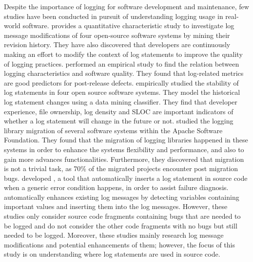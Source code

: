 Despite the importance of logging for software development and maintenance, few studies have been conducted in pursuit of understanding logging usage in real-world software. \citet{yuan2012characterizing} provides a quantitative characteristic study to investigate log message modifications of four open-source software systems by mining their revision history.  They have also discovered that developers are continuously making an effort to modify the context of log statements to improve the quality of logging practices. \citet{shang2015studying} performed an empirical study to find the relation between logging characteristics and software quality. They found that log-related metrics are good predictors for post-release defects. \citet{kabinna2016examining} empirically studied the stability of log statements in four open source software systems. They model the historical log statement changes using a data mining classifier. They find that developer experience, file ownership, log density and SLOC are important indicators of whether a log statement will change in the future or not.
\citet{kabinna2016logging} studied the logging library migration of several software systems within the Apache Software Foundation. They found that the migration of logging libraries happened in these systems in order to enhance the system\textquotesingle s flexibility and performance, and also to gain more advances functionalities. Furthermore, they discovered that migration is not a trivial task, as 70\% of the migrated projects encounter post migration bugs.
\citet{yuan2012conservative} developed , a tool that automatically inserts a log statement in source code when a generic error condition happens, in order to assist failure diagnosis.  \cite{yuan2012improving} automatically enhances existing log messages by detecting variables containing important values and inserting them into the log messages. However, these studies only consider source code fragments containing bugs that are needed to be logged and do not consider the other code fragments with no bugs but still needed to be logged. Moreover, these studies mainly research log message modifications and potential enhancements of them; however, the focus of this study is on understanding where log statements are used in source code.


